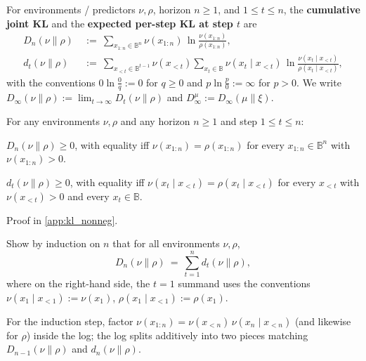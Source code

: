 \documentclass[fontsize=11pt, parskip=half]{scrartcl}
\begin{document}
\begin{definition}\label{def:Dn}
For environments / predictors $\nu, \rho$, horizon $n \geq 1$, and $1 \leq t \leq n$, the \textbf{cumulative joint KL} and the \textbf{expected per-step KL at step $t$} are
\begin{align*}
  D_n(\nu \parallel \rho) ~&:=~ \sum_{x_{1:n} \in \mathbb{B}^n}
                       \nu(x_{1:n}) \,\ln \frac{\nu(x_{1:n})}{\rho(x_{1:n})}, \\[6pt]
  d_t(\nu \parallel \rho) ~&:=~ \sum_{x_{<t} \in \mathbb{B}^{t-1}}
                       \nu(x_{<t}) \sum_{x_t \in \mathbb{B}}
                       \nu(x_t \mid x_{<t}) \,\ln \frac{\nu(x_t \mid x_{<t})}{\rho(x_t \mid x_{<t})},
\end{align*}
with the conventions $0 \ln \tfrac{0}{q} := 0$ for $q \geq 0$ and $p \ln \tfrac{p}{0} := \infty$ for $p > 0$. 
We write $D_\infty(\nu \parallel \rho) := \lim_{t \to \infty} D_t(\nu \parallel \rho)$
and $D^\mu_\infty := D_\infty(\mu \parallel \xi)$.
\end{definition}

\begin{theorem}\label{thm:kl_nonneg}
For any environments $\nu, \rho$ and any horizon $n \geq 1$ and step $1 \leq t \leq n$:
\begin{description}\itemsep=2pt
  \item[\textnormal{(a)}] $D_n(\nu \parallel \rho) \geq 0$, with equality iff $\nu(x_{1:n}) = \rho(x_{1:n})$ for every $x_{1:n} \in \mathbb{B}^n$ with $\nu(x_{1:n}) > 0$.
  \item[\textnormal{(b)}] $d_t(\nu \parallel \rho) \geq 0$, with equality iff $\nu(x_t \mid x_{<t}) = \rho(x_t \mid x_{<t})$ for every $x_{<t}$ with $\nu(x_{<t}) > 0$ and every $x_t \in \mathbb{B}$.
\end{description}
Proof in \cref{app:kl_nonneg}.
\end{theorem}

\begin{exercise}[Telescoping KL]
\label{prob:telescope_ex}



Show by induction on $n$ that for all environments $\nu, \rho$,
\[
D_n(\nu \parallel \rho) ~=~ \sum_{t=1}^{n} d_t(\nu \parallel \rho),
\]
where on the right-hand side, the $t=1$ summand uses the conventions $\nu(x_1 \mid x_{<1}) := \nu(x_1)$, $\rho(x_1 \mid x_{<1}) := \rho(x_1)$.

\begin{hint}
For the induction step, factor $\nu(x_{1:n}) = \nu(x_{<n})\,\nu(x_n \mid x_{<n})$ (and likewise for $\rho$) inside the log; the log splits additively into two pieces matching $D_{n-1}(\nu \parallel \rho)$ and $d_n(\nu \parallel \rho)$.
\end{hint}
\end{exercise}
\end{document}
